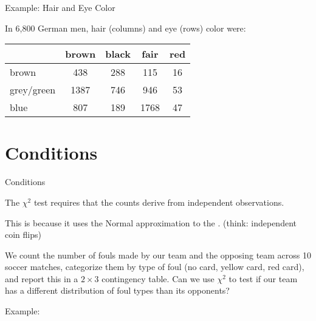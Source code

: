 \begin{frame}{Example: Hair and Eye Color}

    In 6,800 German men, hair (columns) and eye (rows) color were:
        \begin{center}
            \begin{tabular}{l|cccc}
                & brown & black & fair & red \\
                \hline
                brown & 438 & 288 & 115 & 16 \\
                grey/green & 1387 & 746 & 946 & 53 \\
                blue & 807 & 189 & 1768 & 47 \\
            \end{tabular}
        \end{center}

\end{frame}

\section{Conditions}

\begin{frame}{Conditions}

    The $\chi^2$ test requires that the counts derive from \alert{independent observations}.

    \vspace{2em}

    This is because it uses the Normal approximation to the .
    (think: independent coin flips)


    \vspace{2em}

    We count the number of fouls made by our team and the opposing team across 10 soccer matches,
    categorize them by type of foul (no card, yellow card, red card),
    and report this in a $2\times 3$ contingency table.
    Can we use $\chi^2$ to test if our team has a different distribution of foul types than its opponents?

\end{frame}


\begin{frame}{Example:}

    \begin{center}
    \end{center}


\end{frame}


